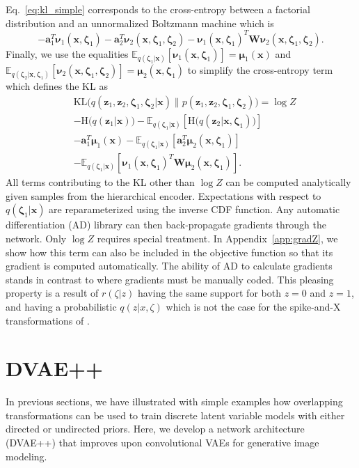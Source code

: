 \documentclass{article}
\newcommand{\x}{{\pmb{x}}}
\newcommand{\z}{{\pmb{z}}}
\renewcommand{\a}{{\pmb{a}}}
\newcommand{\W}{{\pmb{W}}}
\newcommand{\bzeta}{{\pmb{\zeta}}}
\newcommand{\bmu}{{\pmb{\mu}}}
\newcommand{\bnu}{{\pmb{\nu}}}
\newcommand{\E}{{\mathbb{E}}}
\def\KL{\text{KL}}
\def\H{\text{H}}
\begin{document}
Eq.~\eqref{eq:kl_simple} corresponds to the cross-entropy between a factorial distribution and an unnormalized Boltzmann machine which is
\begin{equation*}
- \a_1^T \bnu_1(\x, \bzeta_1) -  \a_2^T \bnu_2(\x, \bzeta_1, \bzeta_2) - \bnu_1(\x, \bzeta_1)^T \W \bnu_2(\x, \bzeta_1, \bzeta_2).
\end{equation*}
Finally, we use the equalities 
$\E_{q(\bzeta_1|\x)}[\bnu_1(\x, \bzeta_1)] = \bmu_1(\x)$ and
$\E_{q(\bzeta_2|\x, \bzeta_1)}[\bnu_2(\x, \bzeta_1, \bzeta_2)] = \bmu_2(\x, \bzeta_1)$
to simplify the cross-entropy term which defines the KL as
\begin{align}
 &\KL\bigl(q(\z_1, \z_2, \bzeta_1, \bzeta_2 | \x) \| p(\z_1, \z_2, \bzeta_1, \bzeta_2)\bigr) =  \log Z \nonumber \\
 & -\H\bigl(q(\z_1|\x)\bigr) - \E_{q(\bzeta_1|\x)} \left[\H\bigl(q(\z_2|\x, \bzeta_1)\bigr)\right] \nonumber \\
 &- \a_1^T \bmu_1(\x) - \E_{q(\bzeta_1|\x)}\left[ \a_2^T \bmu_2(\x, \bzeta_1) \right] \nonumber \\
 &-\E_{q(\bzeta_1|\x)} \left[ \bnu_1(\x, \bzeta_1)^T \W \bmu_2(\x, \bzeta_1) \right]. \nonumber
\end{align}
All terms contributing to the KL other than $\log Z$ can be computed analytically given samples from the hierarchical encoder.
Expectations with respect to $q(\bzeta_1|\x)$ are reparameterized using the inverse CDF function. Any automatic differentiation (AD) library can then back-propagate gradients through the network. Only $\log Z$ requires special treatment. In Appendix~\ref{app:gradZ},
we show how this term can also be included in the objective function so that its gradient is computed automatically. The ability of AD to calculate gradients stands in contrast to \cite{rolfe2016discrete} where gradients must be manually coded. This pleasing property is a result of $r(\zeta|z)$ 
having the same support for both $z=0$ and $z=1$, and
having a probabilistic $q(z|x, \zeta)$ which is not the case for the spike-and-X transformations of  \cite{rolfe2016discrete}.

\section{DVAE++}

In previous sections, we have illustrated with simple examples how overlapping transformations can be used to train discrete latent variable models with either directed or undirected priors. Here, we develop a network architecture (DVAE++) that improves
upon convolutional VAEs for generative image modeling.
\end{document}
